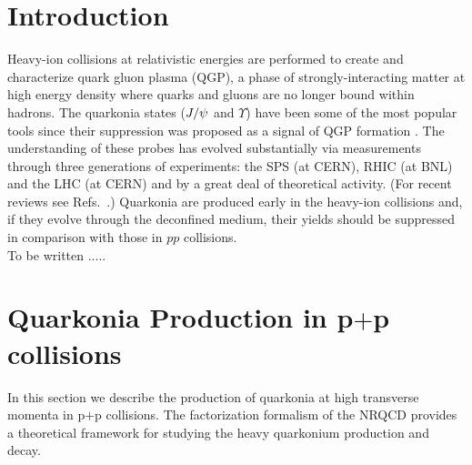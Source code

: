 \documentclass[aps,prc,preprint,superscriptaddress,showpacs,showkeys,amsmath]{revtex4-1}
\begin{document}

\maketitle


\section{Introduction}

Heavy-ion collisions at relativistic energies are performed to create and characterize 
quark gluon plasma (QGP), a phase of strongly-interacting matter at high energy density 
where quarks and gluons are no longer bound within hadrons.
The quarkonia states ($J/\psi$ and $\Upsilon$) have been some of the most popular tools 
since their suppression was proposed as a signal of QGP formation \cite{Matsui:1986dk}.
The understanding of these probes has evolved substantially via measurements 
through three generations of experiments: the SPS (at CERN), RHIC (at BNL) and the LHC (at CERN) 
and by a great deal of theoretical activity. (For recent reviews see 
Refs.~\cite{Schukraft:2013wba,Kluberg:2009wc,Brambilla:2010cs}.)
Quarkonia are produced early in the heavy-ion collisions and, if they evolve
through the deconfined medium, their yields should be suppressed in comparison with those in $pp$ collisions. \\
{\color{red} To be written .....}



\section{Quarkonia Production in p$+$p collisions}
\label{section:ppProduction}
In this section we describe the production of quarkonia at high transverse
momenta in p$+$p collisions. The factorization formalism of the NRQCD  provides 
a theoretical framework for studying the heavy quarkonium production and decay.
\end{document}

